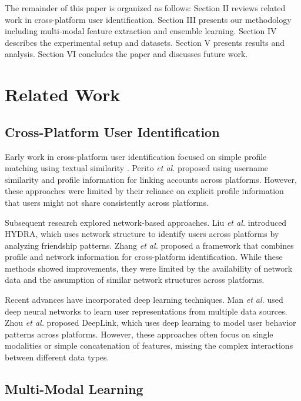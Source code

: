 \documentclass[conference]{IEEEtran}
\begin{document}
The remainder of this paper is organized as follows: Section II reviews related work in cross-platform user identification. Section III presents our methodology including multi-modal feature extraction and ensemble learning. Section IV describes the experimental setup and datasets. Section V presents results and analysis. Section VI concludes the paper and discusses future work.

\section{Related Work}

\subsection{Cross-Platform User Identification}

Early work in cross-platform user identification focused on simple profile matching using textual similarity \cite{zafarani2009connecting}. Perito \emph{et al.} \cite{perito2011we} proposed using username similarity and profile information for linking accounts across platforms. However, these approaches were limited by their reliance on explicit profile information that users might not share consistently across platforms.

Subsequent research explored network-based approaches. Liu \emph{et al.} \cite{liu2016hydra} introduced HYDRA, which uses network structure to identify users across platforms by analyzing friendship patterns. Zhang \emph{et al.} \cite{zhang2015cross} proposed a framework that combines profile and network information for cross-platform identification. While these methods showed improvements, they were limited by the availability of network data and the assumption of similar network structures across platforms.

Recent advances have incorporated deep learning techniques. Man \emph{et al.} \cite{man2016predict} used deep neural networks to learn user representations from multiple data sources. Zhou \emph{et al.} \cite{zhou2018deeplink} proposed DeepLink, which uses deep learning to model user behavior patterns across platforms. However, these approaches often focus on single modalities or simple concatenation of features, missing the complex interactions between different data types.

\subsection{Multi-Modal Learning}
\end{document}
